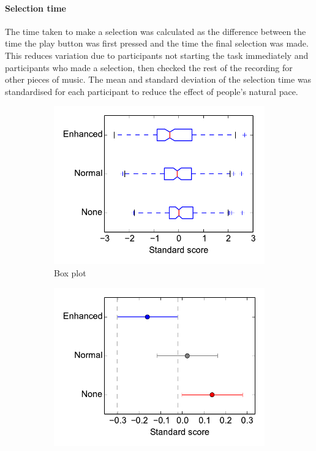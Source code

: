 \paragraph{Selection time}
The time taken to make a selection was calculated as the difference between the
time the play button was first pressed and the time the final selection was
made. This reduces variation due to participants not starting the task
immediately and participants who made a selection, then checked the rest of the
recording for other pieces of music. The mean and standard deviation of the
selection time was standardised for each participant to reduce the effect of
people's natural pace.

\begin{figure}[ht]
\centering
\begin{subfigure}{.5\textwidth}
  \centering
  \includegraphics[width=\textwidth]{figs/playstart-to-selectend-std.pdf}
  \caption{Box plot}
  \label{fig:selecttimebox}
\end{subfigure}%
\begin{subfigure}{.5\textwidth}
  \centering
  \includegraphics[width=\linewidth]{figs/playstart-to-selectend-std-tukey95.pdf}

\end{subfigure}
\end{figure}
